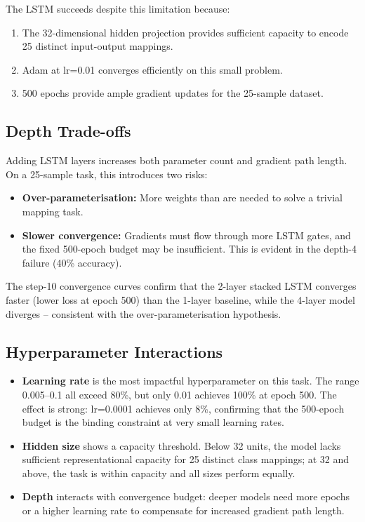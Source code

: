 \documentclass[12pt,a4paper]{article}
\begin{document}
The LSTM succeeds despite this limitation because:
\begin{enumerate}
  \item The 32-dimensional hidden projection provides sufficient capacity to encode 25
        distinct input-output mappings.
  \item Adam at lr=0.01 converges efficiently on this small problem.
  \item 500 epochs provide ample gradient updates for the 25-sample dataset.
\end{enumerate}

\subsection{Depth Trade-offs}

Adding LSTM layers increases both parameter count and gradient path length. On a
25-sample task, this introduces two risks:
\begin{itemize}
  \item \textbf{Over-parameterisation:} More weights than are needed to solve a trivial
        mapping task.
  \item \textbf{Slower convergence:} Gradients must flow through more LSTM gates, and
        the fixed 500-epoch budget may be insufficient. This is evident in the depth-4
        failure (40\% accuracy).
\end{itemize}
The step-10 convergence curves confirm that the 2-layer stacked LSTM converges faster
(lower loss at epoch 500) than the 1-layer baseline, while the 4-layer model diverges --
consistent with the over-parameterisation hypothesis.

\subsection{Hyperparameter Interactions}

\begin{itemize}
  \item \textbf{Learning rate} is the most impactful hyperparameter on this task. The
        range 0.005--0.1 all exceed 80\%, but only 0.01 achieves 100\% at epoch 500.
        The effect is strong: lr=0.0001 achieves only 8\%, confirming that the 500-epoch
        budget is the binding constraint at very small learning rates.
  \item \textbf{Hidden size} shows a capacity threshold. Below 32 units, the model lacks
        sufficient representational capacity for 25 distinct class mappings; at 32 and
        above, the task is within capacity and all sizes perform equally.
  \item \textbf{Depth} interacts with convergence budget: deeper models need more epochs
        or a higher learning rate to compensate for increased gradient path length.
\end{itemize}
\end{document}
